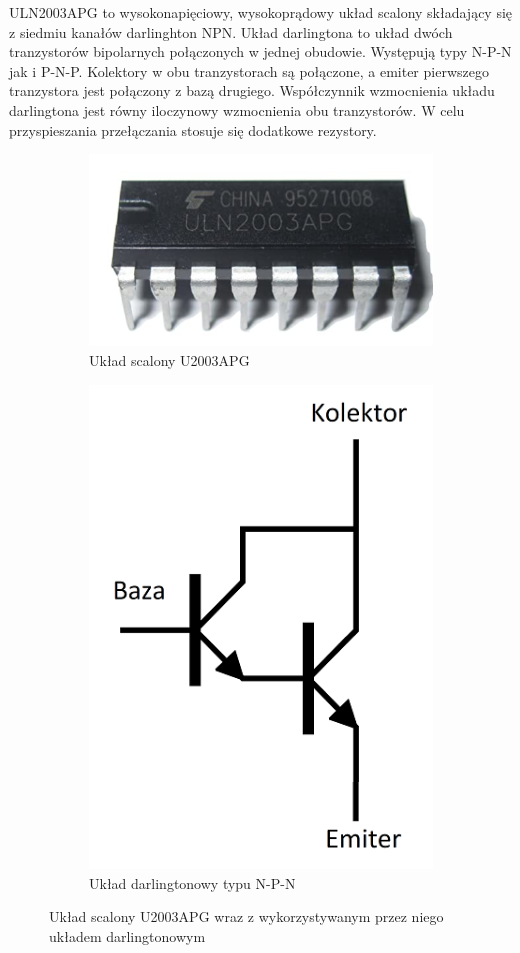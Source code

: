 \documentclass[11pt, a4paper]{article}
\begin{document}


ULN2003APG to wysokonapięciowy, wysokoprądowy układ scalony składający się z siedmiu kanałów darlinghton NPN. Układ darlingtona to układ dwóch tranzystorów bipolarnych połączonych w jednej obudowie. Występują typy N-P-N jak i P-N-P. Kolektory w obu tranzystorach są połączone, a emiter pierwszego tranzystora jest połączony z bazą drugiego. Współczynnik wzmocnienia układu darlingtona jest równy iloczynowy wzmocnienia obu tranzystorów. W celu przyspieszania przełączania stosuje się dodatkowe rezystory.

\vspace{0.5cm}
\begin{figure}[h]
\centering
\begin{subfigure}{.5\textwidth}
  \centering
  \includegraphics[width=.7\linewidth]{fig/obrazki/zasada_dzialania/uln3apg.png}  
  \caption{Układ scalony U2003APG}
  \label{fig:sub1}
\end{subfigure}%
\begin{subfigure}{.5\textwidth}
  \centering
  \includegraphics[width=.4\linewidth]{fig/obrazki/zasada_dzialania/darling2.png}
  \caption{Układ darlingtonowy typu N-P-N}
  \label{fig:sub2}
\end{subfigure}
\caption{Układ scalony U2003APG wraz z wykorzystywanym przez niego układem darlingtonowym}
\label{fig:test}
\end{figure}
\vspace{0.5cm}
\end{document}
